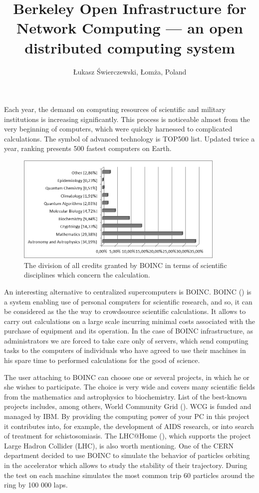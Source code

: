 \documentclass[10pt, a5paper]{article}
\begin{document}
\title{Berkeley Open Infrastructure for Network Computing — an open distributed computing system}
\author{Łukasz Świerczewski, Łomża, Poland}
\maketitle
Each year, the demand on computing resources of scientific and military institutions is increasing significantly. This process is noticeable almost from the very beginning of computers, which were quickly harnessed to complicated calculations. The symbol of advanced technology is TOP500 list. Updated twice a year, ranking presents 500 fastest computers on Earth.

\begin{figure}[b!]
  \centering
  \includegraphics[width=10cm]{104_2013_w_Swierczewski_boinc_1}
  \caption{The division of all credits granted by BOINC in terms of scientific disciplines which concern the calculation.}\label{fig:swier1}
\end{figure}

An interesting alternative to centralized supercomputers is BOINC. BOINC (\cite{swier1}) is a system enabling use of personal computers for scientific research, and so, it can be considered as the the way to crowdsource scientific calculations. It allows to carry out calculations on a large scale incurring minimal costs associated with the purchase of equipment and its operation. In the case of BOINC infrastructure, as administrators we are forced to take care only of servers, which send computing tasks to the computers of individuals who have agreed to use their machines in his spare time to performed calculations for the good of science.

The user attaching to BOINC can choose one or several projects, in which he or she wishes to participate. The choice is very wide and covers many scientific fields from the mathematics and astrophysics to biochemistry. List of the best-known projects includes, among others, World Community Grid (\cite{swier2}). WCG is funded and managed by IBM. By providing the computing power of your PC in this project it contributes into, for example, the development of AIDS research, or into search of treatment for schistosomiasis. The LHC@Home (\cite{swier3}), which supports the project Large Hadron Collider (LHC), is also worth mentioning. One of the CERN department  decided to use BOINC to simulate the behavior of particles orbiting in the accelerator which allows to study the stability of their trajectory. During the test on each machine simulates the most common trip 60 particles around the ring by 100 000 laps.
\end{document}

